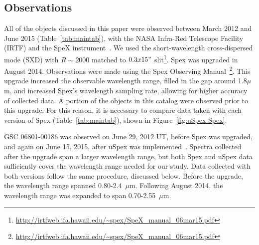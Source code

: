 \subsection{Observations}

All of the objects discussed in this paper were observed between 
March 2012 and June 2015 (Table~\ref{tab:maintab}), with the 
NASA Infra-Red Telescope Facility (IRTF) and the SpeX 
instrument~\cite{Rayner_1998}. We used the short-wavelength cross-dispersed 
mode (SXD) with $R ∼ 2000$ matched to $0.3x15"$ slit\footnote{\url{http://irtfweb.ifa.hawaii.edu/~spex/SpeX_manual_06mar15.pdf}}.  Spex was upgraded in August 2014.  Observations were made using the Spex Observing Manual~\footnote{\url{http://irtfweb.ifa.hawaii.edu/~spex/SpeX_manual_06mar15.pdf}}.  
This upgrade increased the observable wavelength range, filled 
in the gap around 1.8$\mu$m, and increased Spex's wavelength 
sampling rate, allowing for higher accuracy of collected data.
A portion of the objects in this catalog were observed prior to this upgrade.  
For this reason, it is necessary to compare data taken with each version of Spex (Table~\ref{tab:maintab}), 
shown in Figure~\ref{fig:uSpex-Spex}.



GSC 06801-00186 was observed on June 29, 
2012 UT, before Spex was upgraded, and again on June 15, 2015, after uSpex 
was implemented~\cite{Spextool_Manual_Cushing_2015}.  Spectra collected after 
the upgrade span a larger wavelength range, but both Spex and uSpex data sufficiently 
cover the wavelength range needed for our study.  Data collected with both versions 
follow the same procedure, discussed below.  Before the upgrade, the wavelength 
range spanned 0.80-2.4~$\mu$m.  Following August 2014, the wavelength range 
was expanded to span 0.70-2.55~$\mu$m.\\

 



